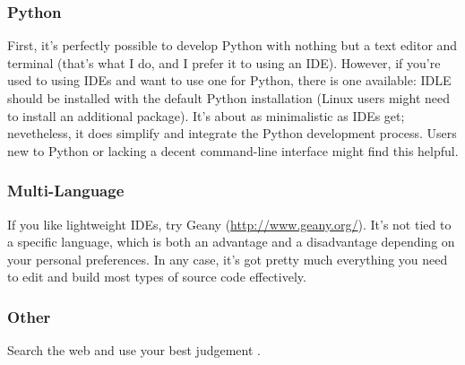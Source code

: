 \documentclass[12pt]{article}
\begin{document}
\subsubsection{Python}
First, it's perfectly possible to develop Python with nothing but a text editor and terminal (that's what I do, and I prefer it to using an IDE). However, if you're used to using IDEs and want to use one for Python, there is one available: IDLE should be installed with the default Python installation (Linux users might need to install an additional package). It's about as minimalistic as IDEs get; nevetheless, it does simplify and integrate the Python development process. Users new to Python or lacking a decent command-line interface might find this helpful.
\subsubsection{Multi-Language}
If you like lightweight IDEs, try Geany (\url{http://www.geany.org/}). It's not tied to a specific language, which is both an advantage and a disadvantage depending on your personal preferences. In any case, it's got pretty much everything you need to edit and build most types of source code effectively.
\subsubsection{Other}
Search the web and use your best judgement \smiley.
\end{document}
